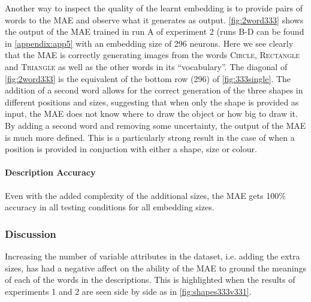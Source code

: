 Another way to inspect the quality of the learnt embedding is to provide pairs of words to the MAE and observe what it generates as output. \autoref{fig:2word333} shows the output of the MAE trained in run A of experiment 2 (runs B-D can be found in \autoref{appendix:app5} with an embedding size of 296 neurons. Here we see clearly that the MAE is correctly generating images from the words \textsc{Circle}, \textsc{Rectangle} and \textsc{Triangle} as well as the other words in its ``vocabulary''. The diagonal of \autoref{fig:2word333} is the equivalent of the bottom row (296) of \autoref{fig:333single}. The addition of a second word allows for the correct generation of the three shapes in different positions and sizes, suggesting that when only the shape is provided as input, the MAE does not know where to draw the object or how big to draw it. By adding a second word and removing some uncertainty, the output of the MAE is much more defined. This is a particularly strong result in the case of when a position is provided in conjuction with either a shape, size or colour. 


\paragraph{Description Accuracy}
Even with the added complexity of the additional sizes, the MAE gets 100\% accuracy in all testing conditions for all embedding sizes. 


\subsubsection{Discussion}

Increasing the number of variable attributes in the dataset, i.e. adding the extra sizes, has had a negative affect on the ability of the MAE to ground the meanings of each of the words in the descriptions. This is highlighted when the results of experiments 1 and 2 are seen side by side as in \autoref{fig:shapes333v331}.

